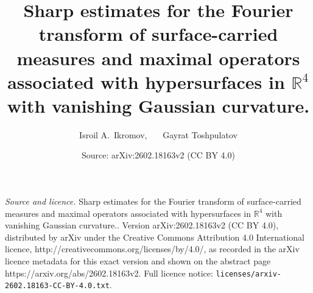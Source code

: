 \documentclass[10pt,a4paper]{amsart}
\title{Sharp estimates for the Fourier transform of surface-carried measures and maximal operators associated with hypersurfaces in $\mathbb{R}^4$ with vanishing Gaussian curvature.}
\author{Isroil A.\, Ikromov, \, \, \, Gayrat Toshpulatov}
\date{Source: arXiv:2602.18163v2 (CC BY 4.0)}
\begin{document}
\maketitle

\noindent\emph{Source and licence.} Sharp estimates for the Fourier transform of surface-carried measures and maximal operators associated with hypersurfaces in $\mathbb{R}^4$ with vanishing Gaussian curvature.. Version arXiv:2602.18163v2 (CC BY 4.0), distributed by arXiv under the Creative Commons Attribution 4.0 International licence, http://creativecommons.org/licenses/by/4.0/, as recorded in the arXiv licence metadata for this exact version and shown on the abstract page https://arxiv.org/abs/2602.18163v2. Full licence notice: \texttt{licenses/arxiv-2602.18163-CC-BY-4.0.txt}.\par\smallskip
\end{document}
